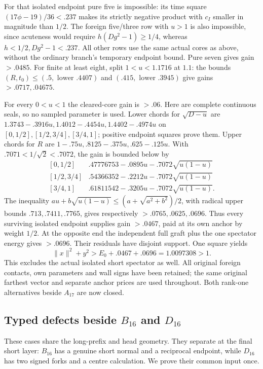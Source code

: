 \documentclass[11pt]{article}
\theoremstyle{definition}
\theoremstyle{remark}
\newcommand{\norm}[1]{\lVert #1\rVert}
\begin{document}
For that isolated endpoint pure five is impossible: its time square
\((17\phi-19)/36<.237\) makes its strictly negative product with
\(c_I\) smaller in magnitude than \(1/2\). The foreign
five/three row with \(u>1\) is also impossible, since acuteness
would require \(h(Dg^2-1)\ge1/4\), whereas
\(h<1/2,Dg^2-1<.237\). All other rows use the same actual cores
as above, without the ordinary branch's temporary endpoint bound.
Pure seven gives gain \(>.0485\). For finite at least eight,
split \(1<u<1.1716\) at \(1.1\): the bounds
\((R,t_0)\le(.5,\text{ lower } .4407)\) and
\((.415,\text{ lower } .3945)\) give gains \(>.0717,.04675\).

For every \(0<u<1\) the cleared-core gain is \(>.06\).
Here are complete continuous seals, so no sampled parameter is used.
Lower chords for \(\sqrt{D-u}\) are
\(1.3743-.3916u,1.4012-.4454u,1.4402-.4974u\)
on \([0,1/2],[1/2,3/4],[3/4,1]\); positive endpoint squares
prove them. Upper chords for \(R\) are
\(1-.75u,.8125-.375u,.625-.125u\).
With \(.7071<1/\sqrt2<.7072\), the gain is bounded below by
\[
\begin{array}{c|c}
{}[0,1/2]&.47776753-.0895u-.7072\sqrt{u(1-u)}\\
{}[1/2,3/4]&.54366352-.2212u-.7072\sqrt{u(1-u)}\\
{}[3/4,1]&.61811542-.3205u-.7072\sqrt{u(1-u)}.
\end{array}
\]
The inequality \(au+b\sqrt{u(1-u)}\le(a+\sqrt{a^2+b^2})/2\),
with radical upper bounds \(.713,.7411,.7765\), gives respectively
\(>.0765,.0625,.0696\). Thus every surviving isolated endpoint
supplies gain \(>.0467\), paid at its own anchor by weight \(1/2\).
At the opposite end the independent full graft plus the one spectator
energy gives \(>.0696\). Their residuals have disjoint support.
One square yields
\[
 \norm x^2+y^2>E_0+.0467+.0696=1.0097308>1.
\]
This excludes the actual isolated short spectator as well. All original
foreign contacts, own parameters and wall signs have been retained;
the same original farthest vector and separate anchor prices are used
throughout. Both rank-one alternatives beside \(A_{17}\) are now closed.

\subsection{Typed defects beside \(B_{16}\) and \(D_{16}\)}
\label{app:BD16typed18}
These cases share the long-prefix and head geometry. They separate at
the final short layer: \(B_{16}\) has a genuine short normal and a
reciprocal endpoint, while \(D_{16}\) has two signed forks and a
centre calculation. We prove their common input once.
\end{document}
